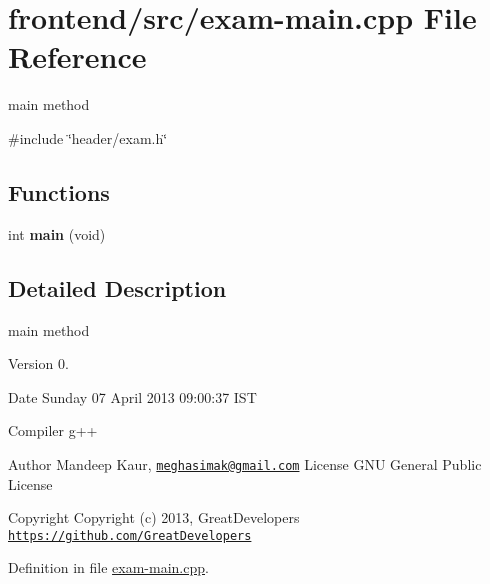 \hypertarget{exam-main_8cpp}{\section{frontend/src/exam-\/main.cpp \-File \-Reference}
\label{db/d60/exam-main_8cpp}
}


main method  


{\ttfamily \#include \char`\"{}header/exam.\-h\char`\"{}}\*
\subsection*{\-Functions}
\begin{DoxyCompactItemize}
\item 
\hypertarget{exam-main_8cpp_a840291bc02cba5474a4cb46a9b9566fe}{int {\bfseries main} (void)}\label{db/d60/exam-main_8cpp_a840291bc02cba5474a4cb46a9b9566fe}

\end{DoxyCompactItemize}


\subsection{\-Detailed \-Description}
main method \begin{DoxyVersion}{\-Version}
0. 
\end{DoxyVersion}
\begin{DoxyDate}{\-Date}
\-Sunday 07 \-April 2013 09\-:00\-:37 \-I\-S\-T\par
 \-Compiler g++
\end{DoxyDate}
\begin{DoxyAuthor}{\-Author}
\-Mandeep \-Kaur, \href{mailto:meghasimak@gmail.com}{\tt meghasimak@gmail.\-com} \-License \-G\-N\-U \-General \-Public \-License 
\end{DoxyAuthor}
\begin{DoxyCopyright}{\-Copyright}
\-Copyright (c) 2013, \-Great\-Developers \href{https://github.com/GreatDevelopers}{\tt https\-://github.\-com/\-Great\-Developers} 
\end{DoxyCopyright}


\-Definition in file \hyperlink{exam-main_8cpp_source}{exam-\/main.\-cpp}.

